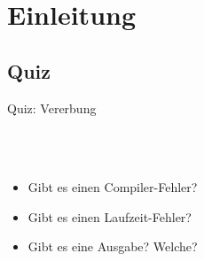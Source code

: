 \documentclass[usepdftitle=false,hyperref={pdfpagelabels=false}]{beamer}
\begin{document}
\title{\titleText}
\subtitle{JUnit, Vererbung, toString(), Interfaces}
\author{\tutor}
\date{\today}
\subject{Programmieren}

\frame{\titlepage}


\section{Einleitung}
\subsection{Quiz}
\begin{frame}{Quiz: Vererbung}
    \begin{minipage}[b]{0.45\linewidth}
        \inputminted[linenos=false, numbersep=5pt, tabsize=4, fontsize=\tiny, label=Animal.java, frame=lines]{java}{Animal.java}
        \inputminted[linenos=false, numbersep=5pt, tabsize=4, fontsize=\tiny, label=Jungle.java, frame=lines]{java}{Jungle.java}
    \end{minipage}
    \hspace{0.5cm}
    \begin{minipage}[b]{0.45\linewidth}
        \inputminted[linenos=false, numbersep=5pt, tabsize=4, fontsize=\tiny, label=Tiger.java, frame=lines]{java}{Tiger.java}
        \inputminted[linenos=false, numbersep=5pt, tabsize=4, fontsize=\tiny, label=Cat.java, frame=lines]{java}{Cat.java}
        \begin{itemize}
            \item Gibt es einen Compiler-Fehler?
            \item Gibt es einen Laufzeit-Fehler?
            \item Gibt es eine Ausgabe? Welche?
        \end{itemize}
    \end{minipage}
\end{frame}
\end{document}
